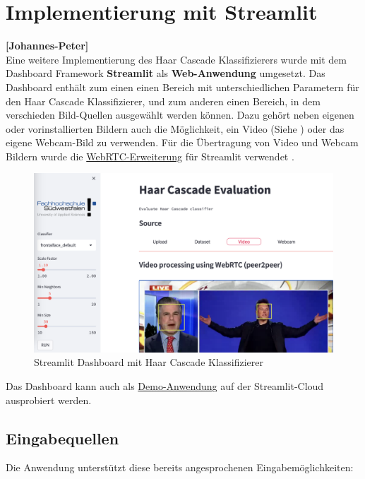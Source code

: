 \section{Implementierung mit Streamlit } 
\textbf{[Johannes-Peter]} \\

Eine weitere Implementierung des Haar Cascade Klassifizierers wurde 
mit dem Dashboard Framework \textbf{Streamlit} als \textbf{Web-Anwendung} umgesetzt. Das Dashboard enthält
zum einen einen Bereich mit unterschiedlichen Parametern für den 
Haar Cascade Klassifizierer, und zum anderen einen Bereich, in dem 
verschieden Bild-Quellen ausgewählt werden können. Dazu gehört
neben eigenen oder vorinstallierten Bildern auch die Möglichkeit, ein Video (Siehe )
oder das eigene Webcam-Bild zu verwenden. Für die Übertragung von Video und Webcam Bildern wurde die 
\href{https://github.com/whitphx/streamlit-webrtc}{WebRTC-Erweiterung} für Streamlit verwendet .

\begin{figure}[h]
 	\includegraphics[scale=0.3]{../images/streamlit/video_example.png}
	\caption{Streamlit Dashboard mit Haar Cascade Klassifizierer}
	\label{fig:streamlit1}
\end{figure}

Das Dashboard kann auch als \href{https://jk-fhswf-pki-a22-app-app-codcuk.streamlit.app/}{Demo-Anwendung}
auf der Streamlit-Cloud ausprobiert werden. 

\subsection{Eingabequellen}
Die Anwendung unterstützt diese bereits angesprochenen Eingabemöglichkeiten:

